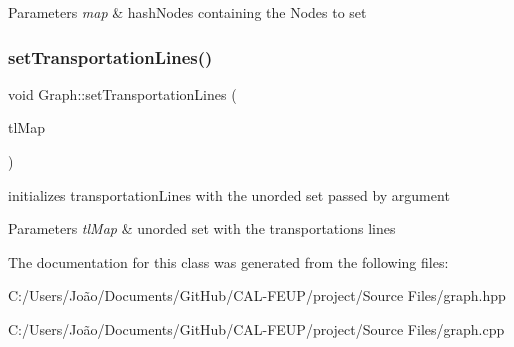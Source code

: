 \begin{DoxyParams}{Parameters}
{\em map} & hash\+Nodes containing the Nodes to set \\
\hline
\end{DoxyParams}
\mbox{\label{class_graph_abfb876ce751334f9d07ee4b8b6bd5370}} 
\subsubsection{\texorpdfstring{set\+Transportation\+Lines()}{setTransportationLines()}}
{\footnotesize\ttfamily void Graph\+::set\+Transportation\+Lines (\begin{DoxyParamCaption}\item[{const hash\+TL \&}]{tl\+Map }\end{DoxyParamCaption})}



initializes transportation\+Lines with the unorded set passed by argument 


\begin{DoxyParams}{Parameters}
{\em tl\+Map} & unorded set with the transportations lines \\
\hline
\end{DoxyParams}


The documentation for this class was generated from the following files\+:\begin{DoxyCompactItemize}
\item 
C\+:/\+Users/\+João/\+Documents/\+Git\+Hub/\+C\+A\+L-\/\+F\+E\+U\+P/project/\+Source Files/graph.\+hpp\item 
C\+:/\+Users/\+João/\+Documents/\+Git\+Hub/\+C\+A\+L-\/\+F\+E\+U\+P/project/\+Source Files/graph.\+cpp\end{DoxyCompactItemize}
